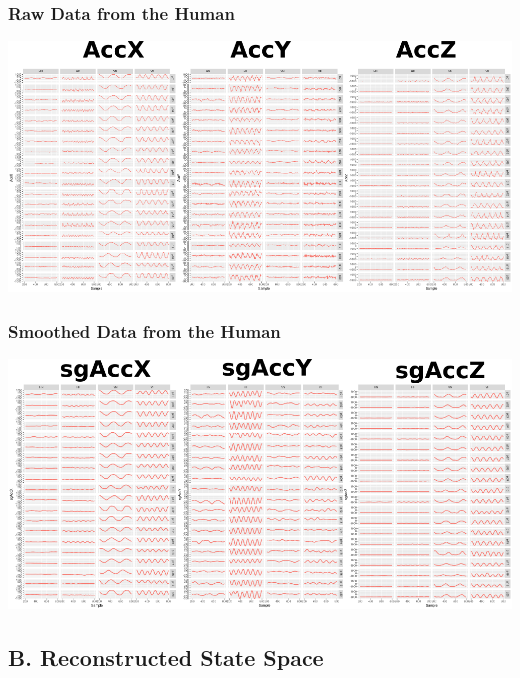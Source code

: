 \documentclass{beamer}
\begin{document}
\begin{frame}
\frametitle{Raw Data from the Human}


\begin{adjustwidth}{-3em}{-3em}
\includegraphics[width=1.2\textwidth]{HS01}
\end{adjustwidth}

\end{frame}



\begin{frame}
\frametitle{Smoothed Data from the Human}


\begin{adjustwidth}{-3em}{-3em}
\includegraphics[width=1.2\textwidth]{HsgS01}
\end{adjustwidth}

\end{frame}




\subsection{B. Reconstructed State Space }
\end{document}
